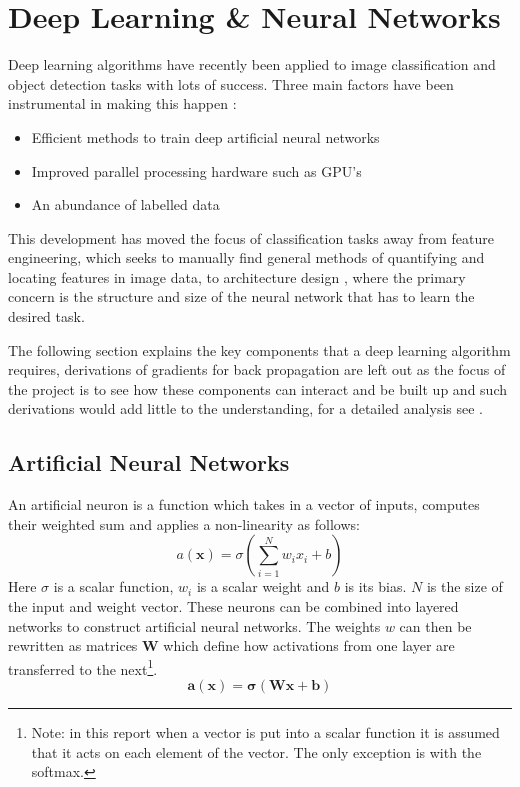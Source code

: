 \section{Deep Learning \& Neural Networks}
  Deep learning algorithms have recently been applied to image classification
  and object detection tasks with lots of success. \cite{Girshick2014,Krizhevsky2012}
  Three main factors have been instrumental in making this happen \cite{Jaiswal2016}:
  \begin{itemize}
    \item Efficient methods to train deep artificial neural networks
    \item Improved parallel processing hardware such as GPU's
    \item An abundance of labelled data
  \end{itemize}
  This development has moved the focus of classification tasks away from feature engineering,
  which seeks to manually find general methods of quantifying and locating features in image data, to
  architecture design \cite{StephenMerity2016}, where the primary concern is the structure and size of the neural network that has to
  learn the desired task.

  The following section explains the key components that a deep learning algorithm requires,
  derivations of gradients for back propagation are left out as the focus of the project is to
  see how these components can interact and be built up and such derivations would add little to the understanding,
  for a detailed analysis see \cite{Bishop1995}.

  \subsection{Artificial Neural Networks} \label{sec:anns}
    An artificial neuron is a function which takes in a vector of inputs, computes their
    weighted sum and applies a non-linearity as follows:
    \begin{equation}
      a(\mathbf{x}) = \sigma \left ( \sum_{i=1}^N w_ix_i + b \right )
    \end{equation}
    Here $\sigma$ is a scalar function, $w_i$ is a scalar weight and $b$ is its bias. $N$ is the size of the input and weight vector.
    These neurons can be combined into layered networks to construct artificial neural networks.
    The weights $w$ can then be rewritten as matrices $\mathbf{W}$ which define how
    activations from one layer are transferred to the next\footnote{Note: in this report when a vector
    is put into a scalar function it is assumed that it acts on each element of
    the vector. The only exception is with the softmax.}.
    \begin{equation}
      \mathbf{a}(\mathbf{x}) = \mathbf{\sigma} \left ( \mathbf{W}\mathbf{x} + \mathbf{b} \right ) \label{eq:softmax}
    \end{equation}

